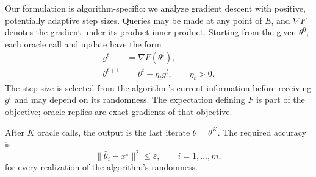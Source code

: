 \documentclass[10pt]{article}
\theoremstyle{definition}
\begin{document}
Our formulation is algorithm-specific: we analyze gradient descent with positive, potentially adaptive step sizes. Queries may be made at any point of $E$, and $\nabla F$ denotes the gradient under its product inner product. Starting from the given $\theta^0$, each oracle call and update have the form
\[
\begin{aligned}
g^t&=\nabla F(\theta^t),\\
\theta^{t+1}&=\theta^t-\eta_t g^t,
\qquad \eta_t>0.
\end{aligned}
\]
The step size is selected from the algorithm's current information before receiving $g^t$ and may depend on its randomness. The expectation defining $F$ is part of the objective; oracle replies are exact gradients of that objective.

After $K$ oracle calls, the output is the last iterate $\bar\theta=\theta^K$. The required accuracy is
\[
\|\bar\theta_i-x^\star\|^2\leq\varepsilon,
\qquad i=1,\ldots,m,
\]
for every realization of the algorithm's randomness.
\end{document}
